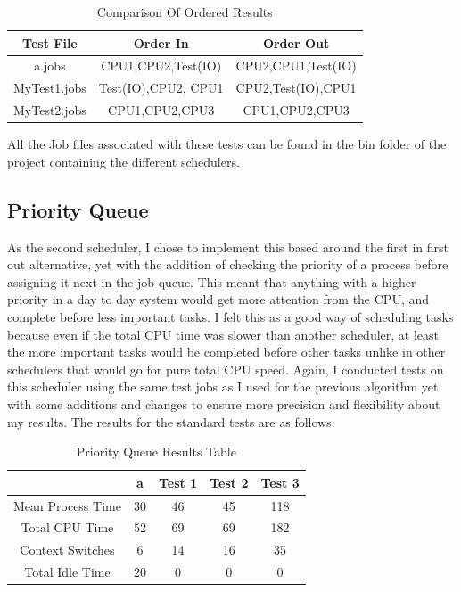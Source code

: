\documentclass{sig-alternate}
\begin{document}
\begin{table}[!h]
\centering
\caption{Comparison Of Ordered Results}
\begin{tabular}{|c|c|c|} \hline
Test File&Order In&Order Out\\ \hline
a.jobs&CPU1,CPU2,Test(IO)&CPU2,CPU1,Test(IO)\\ \hline
MyTest1.jobs&Test(IO),CPU2, CPU1&CPU2,Test(IO),CPU1\\ \hline
MyTest2.jobs&CPU1,CPU2,CPU3&CPU1,CPU2,CPU3\\ \hline
\end{tabular}
\end{table}

All the Job files associated with these tests can be found in the bin folder of
the project containing the different schedulers.

\subsection{Priority Queue}
As the second scheduler, I chose to implement this based around the first in
first out alternative, yet with the addition of checking the priority of a
process before assigning it next in the job queue. This meant that anything with
a higher priority in a day to day system would get more attention from the CPU,
and complete before less important tasks. I felt this as a good way of
scheduling tasks because even if the total CPU time was slower than another
scheduler, at least the more important tasks would be completed before other
tasks unlike in other schedulers that would go for pure total CPU speed. 
\vspace{3mm}
Again, I conducted tests on this scheduler using the same test jobs as I used
for the previous algorithm yet with some additions and changes to ensure more
precision and flexibility about my results. The results for the standard tests
are as follows:
\begin{table}[!h]
\centering
\caption{Priority Queue Results Table}
\begin{tabular}{|c|c|c|c|c|} \hline
&a&Test 1&Test 2&Test 3\\ \hline
Mean Process Time&30&46&45&118\\ \hline
Total CPU Time&52&69&69&182\\ \hline
Context Switches&6&14&16&35\\ \hline
Total Idle Time&20&0&0&0\\ \hline
\end{tabular}
\end{table}
\end{document}
